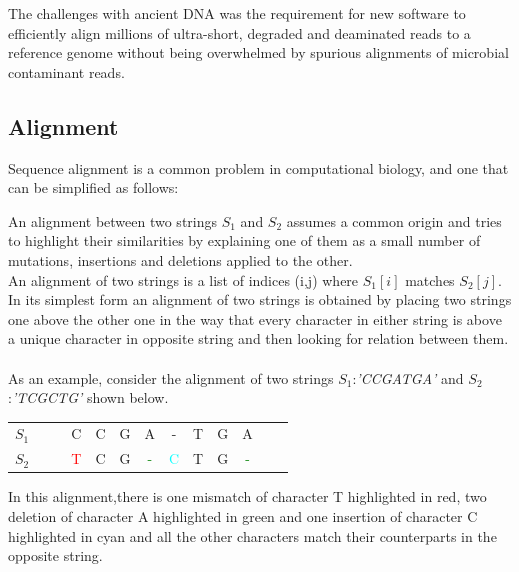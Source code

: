 \documentclass[11pt,a4paper]{report}
\begin{document}
The challenges with ancient DNA was the requirement for new software to efficiently 
align millions of ultra-short, degraded and deaminated reads to a reference genome 
without being overwhelmed by spurious alignments of microbial contaminant reads.


\subsection{Alignment} \label{Alignment}

Sequence alignment is a common problem in computational biology, 
and one that can be simplified as follows:

An alignment between two strings $S_{1}$ and $S_{2}$ assumes a common origin and 
tries to highlight their similarities by explaining one of them as a small number 
of mutations, insertions and deletions applied to the other.\\

An alignment of two strings is a list of indices (i,j) where $S_{1}[i]$ matches
 $S_{2}[j]$.\\ 
In its simplest form an alignment of two strings is obtained by placing two strings
one above the other one in the way that every character in either string is above 
a unique character in opposite string and then looking for relation between them.\\\\

As an example, consider the alignment of two strings $S_{1}$:\emph{'CCGATGA'} 
and $S_{2}$:\emph{'TCGCTG'} shown below. 

\begin{center}
	\begin{tabular}{ c c c |c| c c |c|c| c c|c| c c}
   $S_{1}$   &  & & C & C & G & A & - & T & G & A && \\
$S_{2}$ 	&  & &{\textcolor{red}T}& C & G & {\textcolor{green}-}& {\textcolor{cyan}C } 
 &  T & G & {\textcolor{green}- }& \\
    	                                 
	\end{tabular}
\end{center} 
In this alignment,there is one mismatch of character T highlighted in red, 
two deletion of character A highlighted in green and one insertion of character
C highlighted in cyan and all the other characters match their counterparts in 
the opposite string. 
\\\\
\end{document}
